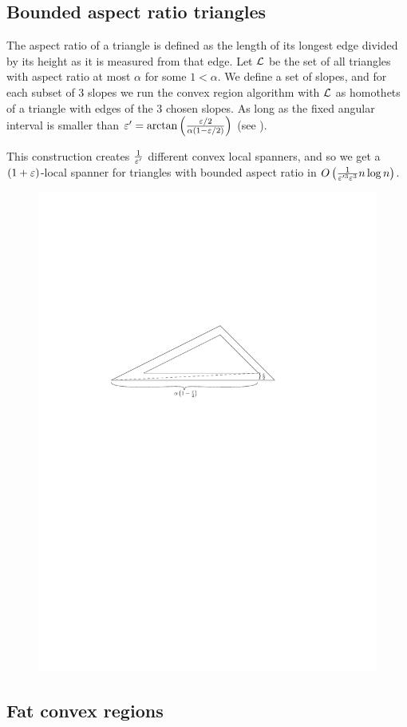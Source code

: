 \documentclass[12pt]{article}%
\begin{document}
\subsection{Bounded aspect ratio triangles}

The aspect ratio of a triangle is defined as the length of its longest
edge divided by its height as it is measured from that edge. Let $\mathcal{L}$
be the set of all triangles with aspect ratio at most $\alpha$ for
some $1 < \alpha$. We define a set of slopes, and for each subset of 3
slopes we run the convex region algorithm with $\mathcal{L}$ as homothets of a
triangle with edges of the 3 chosen slopes. As long as the fixed
angular interval is smaller than
$\varepsilon' = \arctan\left(\frac{\varepsilon/2}{\alpha(1-\varepsilon/2)}\right)$ (see
).

This construction creates $\frac{1}{\varepsilon'}$ different convex local
spanners, and so we get a $(1+\varepsilon)$-local spanner for triangles with
bounded aspect ratio in
$O\left(\frac{1}{\varepsilon'^3\varepsilon^3} n\log n\right)$.


\begin{figure}
    \centering
    \includegraphics[width=0.6\linewidth]{figs/triangle_shadow}
\end{figure}


\subsection{Fat convex regions}
\end{document}

